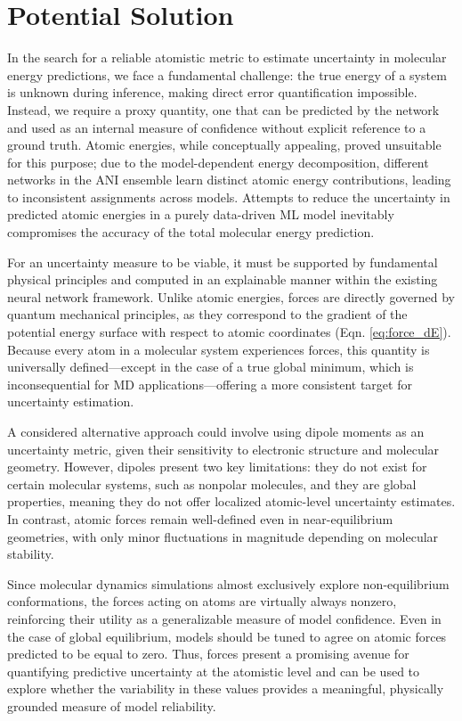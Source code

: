 \section{Potential Solution}
\label{sec:uncertainty_potential_solution}

In the search for a reliable atomistic metric to estimate uncertainty in molecular energy predictions, we face a fundamental challenge: the true energy of a system is unknown during inference, making direct error quantification impossible. 
Instead, we require a proxy quantity, one that can be predicted by the network and used as an internal measure of confidence without explicit reference to a ground truth.
Atomic energies, while conceptually appealing, proved unsuitable for this purpose; due to the model-dependent energy decomposition, different networks in the ANI ensemble learn distinct atomic energy contributions, leading to inconsistent assignments across models.
Attempts to reduce the uncertainty in predicted atomic energies in a purely data-driven ML model inevitably compromises the accuracy of the total molecular energy prediction.

For an uncertainty measure to be viable, it must be supported by fundamental physical principles and computed in an explainable manner within the existing neural network framework. 
Unlike atomic energies, forces are directly governed by quantum mechanical principles, as they correspond to the gradient of the potential energy surface with respect to atomic coordinates (Eqn. \ref{eq:force_dE}). 
Because every atom in a molecular system experiences forces, this quantity is universally defined---except in the case of a true global minimum, which is inconsequential for MD applications---offering a more consistent target for uncertainty estimation.

A considered alternative approach could involve using dipole moments as an uncertainty metric, given their sensitivity to electronic structure and molecular geometry.
However, dipoles present two key limitations: they do not exist for certain molecular systems, such as nonpolar molecules, and they are global properties, meaning they do not offer localized atomic-level uncertainty estimates.
In contrast, atomic forces remain well-defined even in near-equilibrium geometries, with only minor fluctuations in magnitude depending on molecular stability.

Since molecular dynamics simulations almost exclusively explore non-equilibrium conformations, the forces acting on atoms are virtually always nonzero, reinforcing their utility as a generalizable measure of model confidence.
Even in the case of global equilibrium, models should be tuned to agree on atomic forces predicted to be equal to zero. 
Thus, forces present a promising avenue for quantifying predictive uncertainty at the atomistic level and can be used to explore whether the variability in these values provides a meaningful, physically grounded measure of model reliability.


